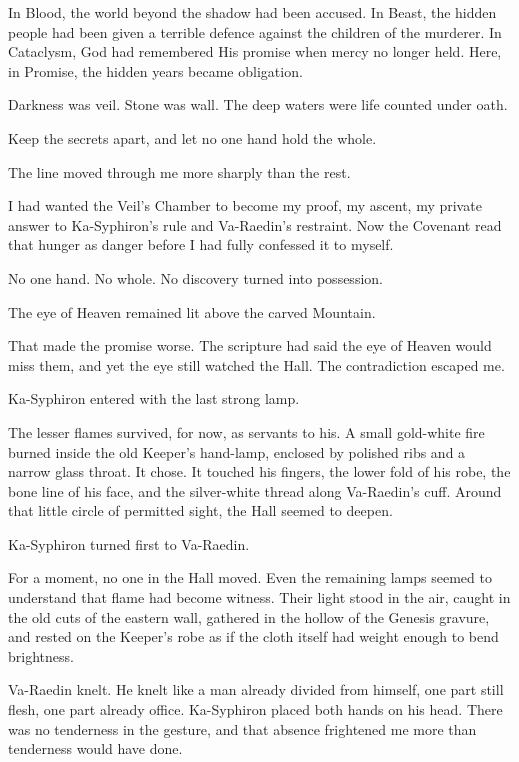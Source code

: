 In Blood, the world beyond the shadow had been accused.
In Beast, the hidden people had been given a terrible defence against the children of the murderer.
In Cataclysm, God had remembered His promise when mercy no longer held.
Here, in Promise, the hidden years became obligation.\par
Darkness was veil.
Stone was wall.
The deep waters were life counted under oath.\par
Keep the secrets apart, and let no one hand hold the whole.\par
The line moved through me more sharply than the rest.\par
I had wanted the Veil's Chamber to become my proof, my ascent, my private answer to Ka-Syphiron's rule and Va-Raedin's restraint.
Now the Covenant read that hunger as danger before I had fully confessed it to myself.\par
No one hand.
No whole.
No discovery turned into possession.\par
The eye of Heaven remained lit above the carved Mountain.\par
That made the promise worse.
The scripture had said the eye of Heaven would miss them, and yet the eye still watched the Hall.
The contradiction escaped me.\par
Ka-Syphiron entered with the last strong lamp.\par
The lesser flames survived, for now, as servants to his.
A small gold-white fire burned inside the old Keeper's hand-lamp, enclosed by polished ribs and a narrow glass throat.
It chose.
It touched his fingers, the lower fold of his robe, the bone line of his face, and the silver-white thread along Va-Raedin's cuff.
Around that little circle of permitted sight, the Hall seemed to deepen.\par
Ka-Syphiron turned first to Va-Raedin.\par
For a moment, no one in the Hall moved.
Even the remaining lamps seemed to understand that flame had become witness.
Their light stood in the air, caught in the old cuts of the eastern wall, gathered in the hollow of the Genesis gravure, and rested on the Keeper's robe as if the cloth itself had weight enough to bend brightness.\par
Va-Raedin knelt.
He knelt like a man already divided from himself, one part still flesh, one part already office.
Ka-Syphiron placed both hands on his head.
There was no tenderness in the gesture, and that absence frightened me more than tenderness would have done.
